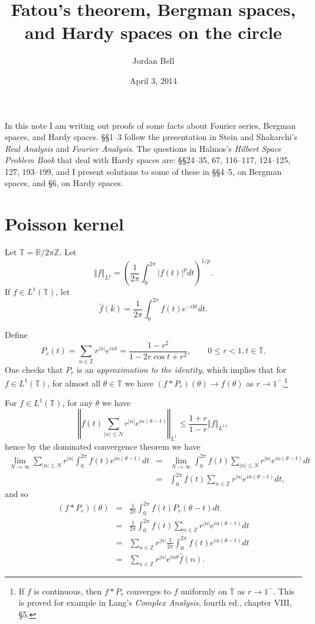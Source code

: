 \documentclass{article}
\newcommand{\norm}[1]{\left\Vert #1 \right\Vert}
\begin{document}
\title{Fatou's theorem, Bergman  spaces, and Hardy spaces on the  circle}
\author{Jordan Bell}
\date{April 3, 2014}
\maketitle

In this note I am writing out proofs of some facts about Fourier series, Bergman spaces, and Hardy spaces. \S \S 1--3 follow the presentation in
Stein and Shakarchi's {\em Real Analysis}
and {\em Fourier Analysis}. The questions in Halmos's {\em Hilbert Space Problem Book} that deal with Hardy spaces are: \S \S 24--35,  67, 116--117,
124--125, 127, 193--199, and I present solutions to some of these in \S \S 4--5, on Bergman spaces, and \S 6, on Hardy spaces.


\section{Poisson kernel}
\label{poissonsection}
Let $\mathbb{T}=\mathbb{R} / 2\pi \mathbb{Z}$.  
Let 
\[
\norm{f}_{L^p} = \left( \frac{1}{2\pi} \int_0^{2\pi} |f(t)|^p dt \right)^{1/p}.
\]
If $f \in L^1(\mathbb{T})$, let
\[
\hat{f}(k)=\frac{1}{2\pi}\int_0^{2\pi} f(t) e^{-ikt}dt.
\] 



Define
\[
P_r(t)=\sum_{n \in \mathbb{Z}} r^{|n|} e^{int}=\frac{1-r^2}{1-2r\cos t + r^2}, \qquad 0 \leq r < 1, t \in \mathbb{T}.
\]
One checks that $P_r$ is an {\em approximation to the identity}, which implies that for $f \in L^1(\mathbb{T})$, for almost
all $\theta \in \mathbb{T}$ we have $(f * P_r)(\theta) \to f(\theta)$ as $r \to 1^-$.\footnote{If $f$ is continuous, then $f*P_r$ converges to $f$ uniformly on
$\mathbb{T}$ as $r \to 1^-$. This is proved for example in Lang's {\em Complex Analysis}, fourth ed., chapter VIII, \S 5.}

For $f \in L^1(\mathbb{T})$, for any $\theta$ we have
\[
\norm{f(t) \sum_{|n| \leq N} r^{|n|} e^{in(\theta-t)}}_{L^1} \leq \frac{1+r}{1-r} \norm{f}_{L^1},
\]
hence by the dominated convergence theorem we have
\begin{eqnarray*}
\lim_{N \to \infty} \sum_{|n| \leq N}  r^{|n|} \int_0^{2\pi} f(t)  e^{in(\theta-t)} dt 
&=&
\lim_{N \to \infty}  \int_0^{2\pi} f(t) \sum_{|n| \leq N} r^{|n|} e^{in(\theta-t)} dt\\
&=&\int_0^{2\pi} f(t) \sum_{n \in \mathbb{Z}} r^{|n|} e^{in(\theta-t)} dt,
\end{eqnarray*}
and so
\begin{eqnarray*}
(f*P_r)(\theta)&=&\frac{1}{2\pi}\int_0^{2\pi} f(t) P_r(\theta-t) dt\\
&=&\frac{1}{2\pi}\int_0^{2\pi} f(t)  \sum_{n \in \mathbb{Z}}  r^{|n|} e^{in(\theta-t)} dt\\
&=&\sum_{n \in \mathbb{Z}}  r^{|n|} \frac{1}{2\pi}\int_0^{2\pi} f(t)  e^{in(\theta-t)} dt\\
&=&\sum_{n \in \mathbb{Z}}  r^{|n|} e^{in\theta} \hat{f}(n).
\end{eqnarray*}
\end{document}
